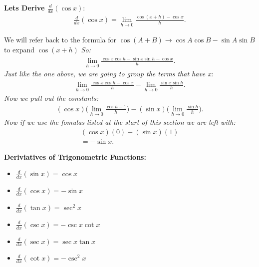 \documentclass{report}
\begin{document}
  \bigbreak \noindent 
   \begin{mdframed}
     \textbf{Lets Derive $ \frac{d}{dx}(\cos{x})$}:
     \begin{align*}
       \frac{d}{dx}(\cos{x}) = \lim_{h \to 0}{ \frac{\cos(x+h) - \cos{x}}{h}}
     .\end{align*}
   \end{mdframed} 
   \bigbreak \noindent  
 We will refer back to the formula for $\cos{(A+B)} \rightarrow \cos{A} \cos{B} - \sin{A} \sin{B}$ to expand $ \cos{(x+h)}$
 \bigbreak \noindent 
 \textit{So:} 
 \begin{align*}
   \lim_{h \to 0}{ \frac{ \cos{x} \cos{h} - \sin{x} \sin{h} - \cos{x}}{h}}
 .\end{align*}
 \bigbreak \noindent 
  \textit{Just like the one above, we are going to group the terms that have x:}
  \begin{align*}
    \lim_{h \to 0}{ \frac{ \cos{x} \cos{h} - \cos{x}}{h}} - \lim_{h \to 0}{ \frac{ \sin{x} \sin{h}}{h}}
  .\end{align*}
  \bigbreak \noindent 
  \textit{Now we pull out the constants:}
  \begin{align*}
    ( \cos{x}) \bigg( \lim_{h \to 0}{ \frac{ \cos{h} - 1}{h}}\bigg) - ( \sin{x}) \bigg( \lim_{h \to 0}{ \frac{ \sin{h}}{h}}\bigg)
  .\end{align*}
  \bigbreak \noindent 
  \textit{Now if we use the fomulas listed at the start of this section we are left with:}
  \begin{align*}
    ( \cos{x})(0) - ( \sin{x})(1) \\ 
    = - \sin{x}
  .\end{align*}

  \bigbreak \noindent \bigbreak \noindent 
  \begin{mdframed}
  \begin{large}
    \textbf{Deriviatives of Trigonometric Functions:}
  \end{large}
  \bigbreak \noindent 
  \begin{itemize}
    \item $ \frac{d}{dx}( \sin{x}) = \cos{x}$
    \item $ \frac{d}{dx}( \cos{x}) = - \sin{x}$
    \item $ \frac{d}{dx}( \tan{x}) = \sec^2{x}$
    \item $ \frac{d}{dx}( \csc{x}) =-\csc{x}\cot{x}$
    \item $ \frac{d}{dx}( \sec{x}) =\sec{x}\tan{x}$
    \item $ \frac{d}{dx}( \cot{x}) =-\csc^2{x}$
  \end{itemize}
  \end{mdframed}
\end{document}
